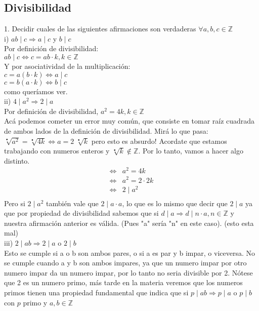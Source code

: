 \documentclass[a4paper,11pt]{article}
\begin{document}
\subsection{Divisibilidad}
1. Decidir cuales de las siguientes afirmaciones son verdaderas $\forall a, b, c \in \mathbb{Z}$\\
i) $ab \mid c \Rightarrow a \mid c$ y $b \mid c$\\
Por definición de divisibilidad:\\
$ab \mid c \Leftrightarrow c = ab \cdot k, k \in \mathbb{Z}$\\
Y por asociatividad de la multiplicación:\\
$c = a (b \cdot k) \Leftrightarrow a \mid c $\\
$c = b (a \cdot k) \Leftrightarrow b	 \mid c $\\
como queríamos ver.\\
ii) $4 \mid a^2 \Rightarrow 2 \mid a$\\
Por definición de divisibilidad, $a^2 = 4k, k\in\mathbb{Z}$\\
Acá podemos cometer un error muy común, que consiste en tomar raíz cuadrada de ambos lados de la definición de divisibilidad. Mirá lo que pasa:\\
$\sqrt[•]{a^2} = \sqrt[•]{4k} \Leftrightarrow a = 2\; \sqrt[•]{k}$ pero esto es absurdo! Acordate que estamos trabajando con numeros enteros y $\sqrt[•]{k} \not\in \mathbb{Z}$. Por lo tanto, vamos a hacer algo distinto.
\begin{align*}
\Leftrightarrow & a^2 = 4k  \\
\Leftrightarrow &  a^2 = 2\cdot 2k\\
\Leftrightarrow &  2 \mid  a^2\\
\end{align*}
Pero si $2 \mid a^2$ también vale que $2 \mid a\cdot a$, lo que es lo mismo que decir que $2 \mid a$ ya que por propiedad de divisibilidad sabemos que si $d \mid a \Rightarrow d \mid n \cdot a, n\in\mathbb{Z}$ y nuestra afirmación anterior es válida. (Pues "a" sería "n" en este caso). (esto esta mal)\\
iii) $ 2 \mid ab \Rightarrow 2 \mid a $ o $2 \mid b$ \\
Esto se cumple si a o b son ambos pares, o si a es par y b impar, o viceversa. No se cumple cuando a y b son ambos impares, ya que un numero impar por otro numero impar da un numero impar, por lo tanto no seria divisible por 2. Nótese que 2 es un numero primo, más tarde en la materia veremos que los numeros primos tienen una propiedad fundamental que indica que si $p \mid ab \Rightarrow p \mid a$ o $p\mid b$ con $p$ primo y $a,b \in\mathbb{Z}$\\
\end{document}
